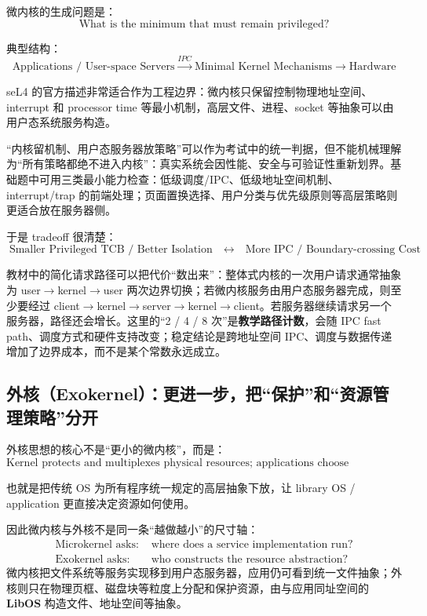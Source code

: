 \documentclass[11pt,a4paper]{ctexart}
\newcommand{\kw}[1]{\textbf{#1}}
\begin{document}
微内核的生成问题是：
\[
\boxed{\text{What is the minimum that must remain privileged?}}
\]

典型结构：
\[
\boxed{
\text{Applications / User-space Servers}
\xrightarrow{IPC}
\text{Minimal Kernel Mechanisms}
\rightarrow
\text{Hardware}
}
\]

seL4 的官方描述非常适合作为工程边界：微内核只保留控制物理地址空间、interrupt 和 processor time 等最小机制，高层文件、进程、socket 等抽象可以由用户态系统服务构造。

“内核留机制、用户态服务器放策略”可以作为考试中的统一判据，但不能机械理解为“所有策略都绝不进入内核”：真实系统会因性能、安全与可验证性重新划界。基础题中可用三类最小能力检查：低级调度/IPC、低级地址空间机制、interrupt/trap 的前端处理；页面置换选择、用户分类与优先级原则等高层策略则更适合放在服务器侧。

于是 tradeoff 很清楚：
\[
\boxed{\text{Smaller Privileged TCB / Better Isolation}}
\quad\leftrightarrow\quad
\boxed{\text{More IPC / Boundary-crossing Cost}}
\]

教材中的简化请求路径可以把代价“数出来”：整体式内核的一次用户请求通常抽象为 user$\to$kernel$\to$user 两次边界切换；若微内核服务由用户态服务器完成，则至少要经过 client$\to$kernel$\to$server$\to$kernel$\to$client。若服务器继续请求另一个服务器，路径还会增长。这里的“2 / 4 / 8 次”是\kw{教学路径计数}，会随 IPC fast path、调度方式和硬件支持改变；稳定结论是跨地址空间 IPC、调度与数据传递增加了边界成本，而不是某个常数永远成立。

\subsection{外核（Exokernel）：更进一步，把“保护”和“资源管理策略”分开}

外核思想的核心不是“更小的微内核”，而是：
\[
\boxed{\text{Kernel protects and multiplexes physical resources; applications choose abstractions/policies}}
\]

也就是把传统 OS 为所有程序统一规定的高层抽象下放，让 library OS / application 更直接决定资源如何使用。

因此微内核与外核不是同一条“越做越小”的尺寸轴：
\[
\boxed{
\begin{aligned}
\text{Microkernel asks: }&\text{where does a service implementation run?}\\
\text{Exokernel asks: }&\text{who constructs the resource abstraction?}
\end{aligned}
}
\]
微内核把文件系统等服务实现移到用户态服务器，应用仍可看到统一文件抽象；外核则只在物理页框、磁盘块等粒度上分配和保护资源，由与应用同址空间的 \kw{LibOS} 构造文件、地址空间等抽象。
\end{document}

